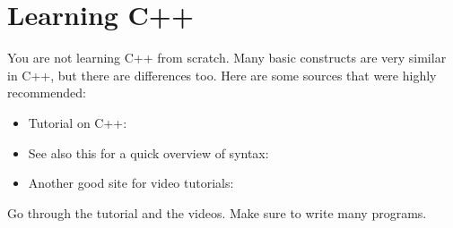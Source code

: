 \documentclass[letterpaper,10pt,english]{sphinxmanual}
\begin{document}
\section{Learning C++}
\label{\detokenize{lecture_notes/transition:learning-c}}
You are not learning C++ from scratch. Many basic constructs are very
similar in C++, but there are differences too. Here are some sources
that were highly recommended:
\begin{itemize}
\item {} 
Tutorial on C++:


\item {} 
See also this for a quick overview of syntax:


\item {} 
Another good site for video tutorials:


\end{itemize}

Go through the tutorial and the videos. Make sure to write many
programs.
\end{document}
